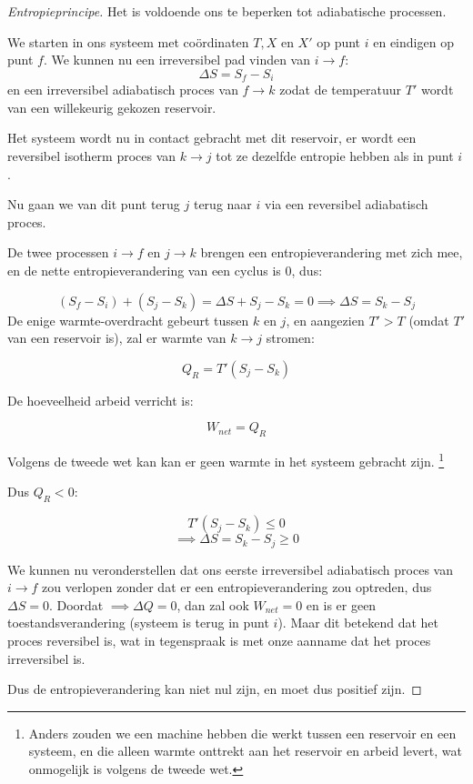 \begin{proof}[Entropieprincipe]
    Het is voldoende ons te beperken tot adiabatische processen.

    We starten in ons systeem met coördinaten \(T, X\) en \(X'\) op punt \(i\) en eindigen op punt \(f\).
    We kunnen nu een irreversibel pad vinden van \(i \to f\):
    \[
    \Delta S = S_f - S_i
    \]
    en een irreversibel adiabatisch proces van \(f \to k\) zodat de temperatuur \(T'\) wordt van een willekeurig gekozen reservoir.

    Het systeem wordt nu in contact gebracht met dit reservoir, er wordt een reversibel isotherm proces van \(k \to j\) tot ze dezelfde entropie hebben als in punt \(i\).

    Nu gaan we van dit punt terug \(j\) terug naar \(i\) via een reversibel adiabatisch proces.

    De twee processen \(i \to f\) en \(j \to k\) brengen een entropieverandering met zich mee, en de nette entropieverandering van een cyclus is \(0\), dus:

    \[
    (S_f-S_i) + (S_j- S_k) = \Delta S + S_j - S_k = 0
     \implies \Delta S = S_k - S_j
    \]
    De enige warmte-overdracht gebeurt tussen \(k\) en \(j\), en aangezien \(T' > T\) (omdat \(T'\) van een reservoir is), zal er warmte van \(k \to j\) stromen:

    \[
    Q_R = T' (S_j-S_k)
    \]

    De hoeveelheid arbeid verricht is:

    \[
    W_{net} = Q_R
    \]

    Volgens de tweede wet kan kan er geen warmte in het systeem gebracht zijn.
    \footnote{Anders zouden we een machine hebben die werkt tussen een reservoir en een systeem, en die alleen warmte onttrekt aan het reservoir en arbeid levert, wat onmogelijk is volgens de tweede wet.}

    Dus \(Q_R<0\):

    \[
    T'(S_j-S_k) \leq 0
    \]
    \[
    \implies \Delta S = S_k - S_j \geq 0
    \]

    We kunnen nu veronderstellen dat ons eerste irreversibel adiabatisch proces van \(i \to f\) zou verlopen zonder dat er een entropieverandering zou optreden, dus \(\Delta S = 0\).
    Doordat \(\implies \Delta Q = 0 \), dan zal ook \(W_{net} = 0\) en is er geen toestandsverandering (systeem is terug in punt \(i\)).
    Maar dit betekend dat het proces reversibel is, wat in tegenspraak is met onze aanname dat het proces irreversibel is.

    Dus de entropieverandering kan niet nul zijn, en moet dus positief zijn.
\end{proof}

